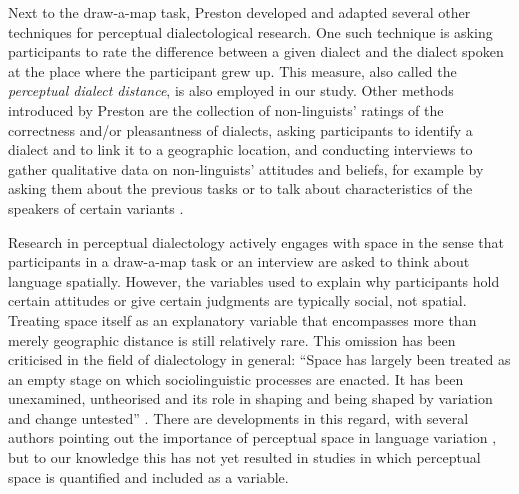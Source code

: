 \documentclass[output=paper,colorlinks,citecolor=brown,draft]{langscibook}
\begin{document}
Next to the draw-a-map task, Preston developed and adapted several other techniques for perceptual dialectological research. One such technique is asking participants to rate the difference between a given dialect and the dialect spoken at the place where the participant grew up. This measure, also called the \textit{perceptual dialect distance}, is also employed in our study. Other methods introduced by Preston are the collection of non-linguists' ratings of the correctness and/or pleasantness of dialects, asking participants to identify a dialect and to link it to a geographic location, and conducting interviews to gather qualitative data on non-linguists' attitudes and beliefs, for example by asking them about the previous tasks or to talk about characteristics of the speakers of certain variants \citep{preston_handbook_1999}. 

Research in perceptual dialectology actively engages with space in the sense that participants in a draw-a-map task or an interview are asked to think about language spatially. However, the variables used to explain why participants hold certain attitudes or give certain judgments are typically social, not spatial. Treating space itself as an explanatory variable that encompasses more than merely geographic distance is still relatively rare. This omission has been criticised in the field of dialectology in general: ``Space has largely been treated as an empty stage on which sociolinguistic processes are enacted. It has been unexamined, untheorised and its role in shaping and being shaped by variation and change untested'' \citep[471]{britain_space_2013}. There are developments in this regard, with several authors pointing out the importance of perceptual space in language variation \citep[e.g.][]{britain_conceptualizations_2011, Preston2010}, but to our knowledge this has not yet resulted in studies in which perceptual space is quantified and included as a variable. 
\end{document}
